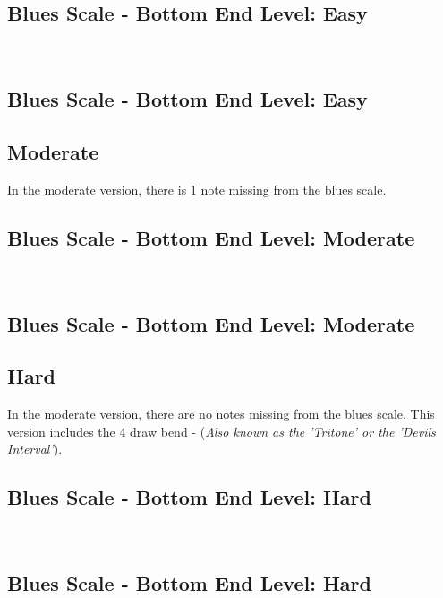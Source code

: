                 \subsection*{Blues Scale - Bottom End \Downarrow Level: Easy}
                    \4\3\2 \\
                
                \subsection*{Blues Scale - Bottom End \Uparrow Level: Easy}
                    \2 \3 \4
        
        \newpage
            \subsection*{Moderate}
            In the moderate version, there is 1 note missing from the blues scale.

                \subsection*{Blues Scale - Bottom End \Downarrow Level: Moderate}
                    \4\four\3\2 \\
                
                \subsection*{Blues Scale - Bottom End \Uparrow Level: Moderate}
                    \2\3\four\4
        
        
        \newpage    
            \subsection*{Hard}
            In the moderate version, there are no notes missing from the blues scale.
            This version includes the 4 draw bend - (\textit{Also known as the 'Tritone' or the 'Devils Interval'}).
                \subsection*{Blues Scale - Bottom End \Downarrow Level: Hard}
                    \4\e\four\3\2 \\
                
                \subsection*{Blues Scale - Bottom End \Uparrow Level: Hard}
                    \2\3\four\e\4
            